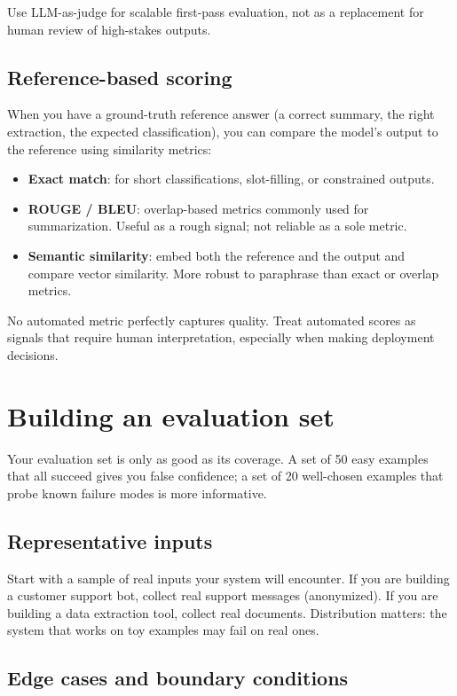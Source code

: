 Use LLM-as-judge for scalable first-pass evaluation, not as a replacement for human review of high-stakes outputs.

\subsection{Reference-based scoring}

When you have a ground-truth reference answer (a correct summary, the right extraction, the expected classification), you can compare the model's output to the reference using similarity metrics:

\begin{itemize}[noitemsep,topsep=0pt]
  \item \textbf{Exact match}: for short classifications, slot-filling, or constrained outputs.
  \item \textbf{ROUGE / BLEU}: overlap-based metrics commonly used for summarization. Useful as a rough signal; not reliable as a sole metric.
  \item \textbf{Semantic similarity}: embed both the reference and the output and compare vector similarity. More robust to paraphrase than exact or overlap metrics.
\end{itemize}

No automated metric perfectly captures quality. Treat automated scores as signals that require human interpretation, especially when making deployment decisions.

\section{Building an evaluation set}

Your evaluation set is only as good as its coverage. A set of 50 easy examples that all succeed gives you false confidence; a set of 20 well-chosen examples that probe known failure modes is more informative.

\subsection{Representative inputs}

Start with a sample of real inputs your system will encounter. If you are building a customer support bot, collect real support messages (anonymized). If you are building a data extraction tool, collect real documents. Distribution matters: the system that works on toy examples may fail on real ones.

\subsection{Edge cases and boundary conditions}


